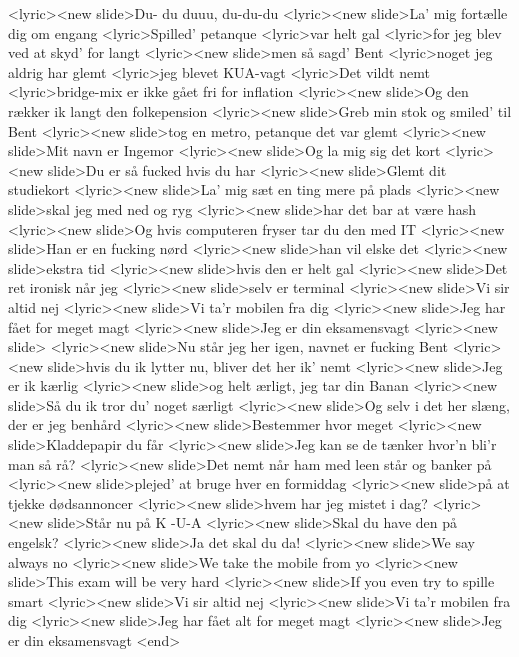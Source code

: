 <lyric><new slide>Du- du duuu, du-du-du
<lyric><new slide>La' mig fortælle dig om engang
<lyric>Spilled' petanque
<lyric>var helt gal
<lyric>for jeg blev ved at skyd' for langt
<lyric><new slide>men så sagd' Bent
<lyric>noget jeg aldrig har glemt
<lyric>jeg blevet KUA-vagt
<lyric>Det vildt nemt
<lyric>bridge-mix er ikke gået fri for inflation
<lyric><new slide>Og den rækker ik langt den folkepension
<lyric><new slide>Greb min stok og smiled' til Bent
<lyric><new slide>tog en metro, petanque det var glemt
<lyric><new slide>Mit navn er Ingemor
<lyric><new slide>Og la mig sig det kort
<lyric><new slide>Du er så fucked hvis du har
<lyric><new slide>Glemt dit studiekort
<lyric><new slide>La' mig sæt en ting mere på plads
<lyric><new slide>skal jeg med ned og ryg
<lyric><new slide>har det bar at være hash
<lyric><new slide>Og hvis computeren fryser tar du den med IT
<lyric><new slide>Han er en fucking nørd
<lyric><new slide>han vil elske det
<lyric><new slide>ekstra tid
<lyric><new slide>hvis den er helt gal
<lyric><new slide>Det ret ironisk når jeg
<lyric><new slide>selv er terminal
<lyric><new slide>Vi sir altid nej
<lyric><new slide>Vi ta'r mobilen fra dig
<lyric><new slide>Jeg har fået for meget magt
<lyric><new slide>Jeg er din eksamensvagt
<lyric><new slide>
<lyric><new slide>Nu står jeg her igen, navnet er fucking Bent
<lyric><new slide>hvis du ik lytter nu, bliver det her ik' nemt
<lyric><new slide>Jeg er ik kærlig
<lyric><new slide>og helt ærligt, jeg tar din Banan
<lyric><new slide>Så du ik tror du' noget særligt
<lyric><new slide>Og selv i det her slæng, der er jeg benhård
<lyric><new slide>Bestemmer hvor meget
<lyric><new slide>Kladdepapir du får
<lyric><new slide>Jeg kan se de tænker hvor'n bli'r man så rå?
<lyric><new slide>Det nemt når ham med leen står og banker på
<lyric><new slide>plejed' at bruge hver en formiddag
<lyric><new slide>på at tjekke dødsannoncer
<lyric><new slide>hvem har jeg mistet i dag?
<lyric><new slide>Står nu    på K   -U-A
<lyric><new slide>Skal du have den på engelsk?
<lyric><new slide>Ja det skal du da!
<lyric><new slide>We say always no
<lyric><new slide>We take the mobile from yo
<lyric><new slide>This exam will be very hard
<lyric><new slide>If you even try to spille smart
<lyric><new slide>Vi sir altid nej
<lyric><new slide>Vi ta'r mobilen fra dig
<lyric><new slide>Jeg har fået alt for meget magt
<lyric><new slide>Jeg er din eksamensvagt
<end>

